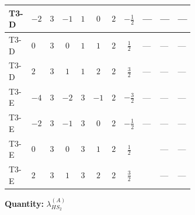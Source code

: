 \documentclass[8pt]{article}
\begin{document}
\begin{landscape}
\begin{longtable}{@{}llcccccc >{\raggedright\arraybackslash}p{0.21\linewidth} >{\raggedright\arraybackslash}p{0.21\linewidth} >{\raggedright\arraybackslash}p{0.21\linewidth}@{}}
\midrule
T3-D & $-2$ & $3$ & $-1$ & $1$ & $0$ & $2$ & $-\frac{1}{2}$ & --- & --- & --- \\
\midrule
T3-D & $0$ & $3$ & $0$ & $1$ & $1$ & $2$ & $\frac{1}{2}$ & --- & --- & --- \\
\midrule
T3-D & $2$ & $3$ & $1$ & $1$ & $2$ & $2$ & $\frac{3}{2}$ & --- & --- & --- \\
\midrule
T3-E & $-4$ & $3$ & $-2$ & $3$ & $-1$ & $2$ & $-\frac{3}{2}$ & --- & --- & --- \\
\midrule
T3-E & $-2$ & $3$ & $-1$ & $3$ & $0$ & $2$ & $-\frac{1}{2}$ & --- & --- & --- \\
\midrule
T3-E & $0$ & $3$ & $0$ & $3$ & $1$ & $2$ & $\frac{1}{2}$ & \scriptsize\adjustbox{max width=\linewidth}{$\begin{gathered} +{g_1}^2 \left(4 {g_2}^2-\frac{15 {\lambda_{HS_2}^{(A)}}}{2}\right)\end{gathered}$} & --- & --- \\
\midrule
T3-E & $2$ & $3$ & $1$ & $3$ & $2$ & $2$ & $\frac{3}{2}$ & \scriptsize\adjustbox{max width=\linewidth}{$\begin{gathered} +{g_1}^2 \left(8 {g_2}^2-\frac{51 {\lambda_{HS_2}^{(A)}}}{2}\right)\end{gathered}$} & --- & --- \\
\midrule
\bottomrule
\end{longtable}
\clearpage
\noindent\textbf{Quantity: }$\lambda_{HS_2}^{(A)}$\par\smallskip

\end{landscape}
\end{document}
